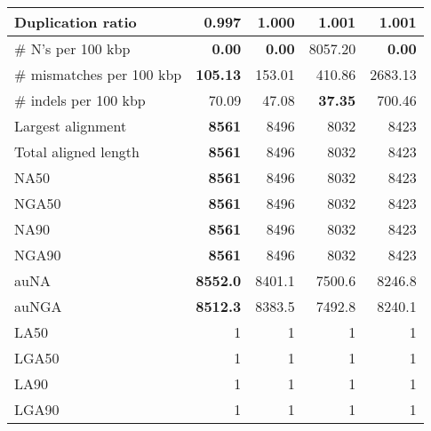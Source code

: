 \documentclass[12pt,a4paper]{article}
\begin{document}
\begin{table}[ht]
\begin{center}
\begin{tabular}{|l*{4}{|r}|}
Duplication ratio & {\bf 0.997} & 1.000 & 1.001 & 1.001 \\ \hline
\# N's per 100 kbp & {\bf 0.00} & {\bf 0.00} & 8057.20 & {\bf 0.00} \\ \hline
\# mismatches per 100 kbp & {\bf 105.13} & 153.01 & 410.86 & 2683.13 \\ \hline
\# indels per 100 kbp & 70.09 & 47.08 & {\bf 37.35} & 700.46 \\ \hline
Largest alignment & {\bf 8561} & 8496 & 8032 & 8423 \\ \hline
Total aligned length & {\bf 8561} & 8496 & 8032 & 8423 \\ \hline
NA50 & {\bf 8561} & 8496 & 8032 & 8423 \\ \hline
NGA50 & {\bf 8561} & 8496 & 8032 & 8423 \\ \hline
NA90 & {\bf 8561} & 8496 & 8032 & 8423 \\ \hline
NGA90 & {\bf 8561} & 8496 & 8032 & 8423 \\ \hline
auNA & {\bf 8552.0} & 8401.1 & 7500.6 & 8246.8 \\ \hline
auNGA & {\bf 8512.3} & 8383.5 & 7492.8 & 8240.1 \\ \hline
LA50 & 1 & 1 & 1 & 1 \\ \hline
LGA50 & 1 & 1 & 1 & 1 \\ \hline
LA90 & 1 & 1 & 1 & 1 \\ \hline
LGA90 & 1 & 1 & 1 & 1 \\ \hline
\end{tabular}
\end{center}
\end{table}
\end{document}
